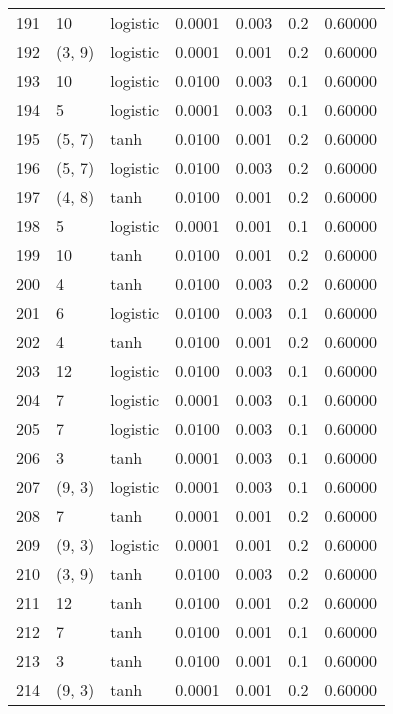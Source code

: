 \begin{tabular}{lllrrrr}
191 &          10 &  logistic &  0.0001 &  0.003 &  0.2 &   0.60000 \\
192 &      (3, 9) &  logistic &  0.0001 &  0.001 &  0.2 &   0.60000 \\
193 &          10 &  logistic &  0.0100 &  0.003 &  0.1 &   0.60000 \\
194 &           5 &  logistic &  0.0001 &  0.003 &  0.1 &   0.60000 \\
195 &      (5, 7) &      tanh &  0.0100 &  0.001 &  0.2 &   0.60000 \\
196 &      (5, 7) &  logistic &  0.0100 &  0.003 &  0.2 &   0.60000 \\
197 &      (4, 8) &      tanh &  0.0100 &  0.001 &  0.2 &   0.60000 \\
198 &           5 &  logistic &  0.0001 &  0.001 &  0.1 &   0.60000 \\
199 &          10 &      tanh &  0.0100 &  0.001 &  0.2 &   0.60000 \\
200 &           4 &      tanh &  0.0100 &  0.003 &  0.2 &   0.60000 \\
201 &           6 &  logistic &  0.0100 &  0.003 &  0.1 &   0.60000 \\
202 &           4 &      tanh &  0.0100 &  0.001 &  0.2 &   0.60000 \\
203 &          12 &  logistic &  0.0100 &  0.003 &  0.1 &   0.60000 \\
204 &           7 &  logistic &  0.0001 &  0.003 &  0.1 &   0.60000 \\
205 &           7 &  logistic &  0.0100 &  0.003 &  0.1 &   0.60000 \\
206 &           3 &      tanh &  0.0001 &  0.003 &  0.1 &   0.60000 \\
207 &      (9, 3) &  logistic &  0.0001 &  0.003 &  0.1 &   0.60000 \\
208 &           7 &      tanh &  0.0001 &  0.001 &  0.2 &   0.60000 \\
209 &      (9, 3) &  logistic &  0.0001 &  0.001 &  0.2 &   0.60000 \\
210 &      (3, 9) &      tanh &  0.0100 &  0.003 &  0.2 &   0.60000 \\
211 &          12 &      tanh &  0.0100 &  0.001 &  0.2 &   0.60000 \\
212 &           7 &      tanh &  0.0100 &  0.001 &  0.1 &   0.60000 \\
213 &           3 &      tanh &  0.0100 &  0.001 &  0.1 &   0.60000 \\
214 &      (9, 3) &      tanh &  0.0001 &  0.001 &  0.2 &   0.60000 \\

\end{tabular}
